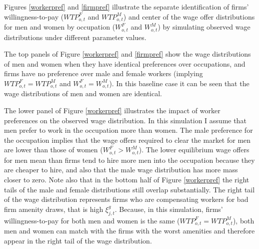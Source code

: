 \documentclass[12pt]{article}
\begin{document}


Figures \ref{workerpref} and \ref{firmpref} illustrate the separate identification of firms' willingness-to-pay ($WTP^F_{o,t}$ and $WTP^M_{o,t}$) and center of the wage offer distributions for men and women by occupation ($W^F_{o,t}$ and $W^M_{o,t}$) by simulating observed wage distributions under different parameter values. 

The top panels of Figure \ref{workerpref} and \ref{firmpref} show the wage distributions of men and women when they have identical preferences over occupations, and firms have no preference over male and female workers (implying $WTP^F_{o,t}=WTP^M_{o,t}$ and $W^F_{o,t}=W^M_{o,t}$). In this baseline case it can be seen that the wage distributions of men and women are identical. 

The lower panel of Figure \ref{workerpref} illustrates the impact of worker preferences on the observed wage distribution. In this simulation I assume that men prefer to work in the occupation more than women. The male preference for the occupation implies that the wage offers required to clear the market for men are lower than those of women ($W^F_{o,t} > W^M_{o,t}$). The lower equilibrium wage offers for men mean than firms tend to hire more men into the occupation because they are cheaper to hire, and also that the male wage distribution has more mass closer to zero. Note also that in the bottom half of Figure \ref{workerpref} the right tails of the male and female distributions still overlap substantially. The right tail of the wage distribution represents firms who are compensating workers for bad firm amenity draws, that is high $\xi^g_{j,t}$. Because, in this simulation, firms' willingness-to-pay for both men and women is the same ($WTP^F_{o,t}=WTP^M_{o,t}$), both men and women can match with the firms with the worst amenities and therefore appear in the right tail of the wage distribution.
\end{document}
